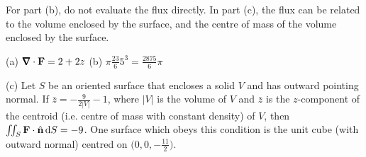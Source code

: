 \begin{hint} 
For part (b), do not evaluate the flux directly.
In part (c), the flux can be related to the volume enclosed by the
surface, and the centre of mass of the volume enclosed by the surface.

\end{hint}

\begin{answer} 
(a) $\vnabla\cdot\vF =2+2z$\qquad
(b) $\pi\frac{23}{6} 5^3 =\frac{2875}{6}\pi$  

(c) Let $S$ be an oriented surface that encloses a solid $V$ and has outward pointing normal. If $\bar z = -\frac{9}{2|V|}-1$, where $|V|$ is the 
volume of $V$ and $\bar z$ is the $z$-component of the centroid
(i.e. centre of mass with constant density) of $V$, then 
$\iint_{S} \mathbf{F}\cdot\hat{\mathbf{n}}\,\mathrm{d}S=-9$. One surface which obeys 
this condition is the unit cube (with outward normal)
centred on $\big(0,0, -\frac{11}{2}\big)$.
\end{answer}

